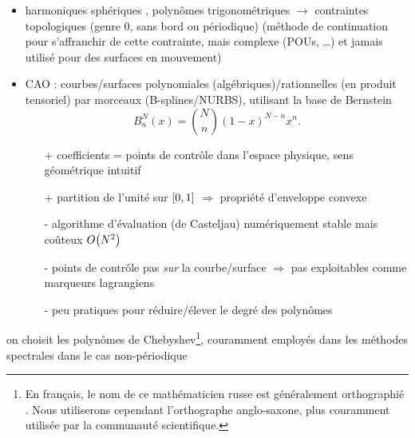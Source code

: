 \begin{itemize}
	\item harmoniques sphériques \cite{veerapaneni2011}, polynômes trigonométriques \cite{gueyffier2015} $\to$ contraintes topologiques (genre 0, sans bord ou périodique) (méthode de continuation \cite{bruno2007} pour s'affranchir de cette contrainte, mais complexe (POUs, \ldots) et jamais utilisé pour des surfaces en mouvement)
	\item CAO : courbes/surfaces polynomiales (algébriques)/rationnelles (en produit tensoriel) par morceaux (B-splines/NURBS), utilisant la base de Bernstein
	\begin{equation}
		B_n^N(x) = \binom{N}{n} \left( 1 - x \right)^{N-n} x^n.
	\end{equation}
	\begin{itemize}
		\item[+] coefficients = points de contrôle dans l'espace physique, sens géométrique intuitif
		\item[+] partition de l'unité sur $\left[ 0, 1 \right]$ $\Rightarrow$ propriété d'enveloppe convexe
		\item[-] algorithme d'évaluation (de Casteljau) numériquement stable mais coûteux $O\!\left( {N^2} \right)$
		\item[-] points de contrôle pas \emph{sur} la courbe/surface $\Rightarrow$ pas exploitables comme marqueurs lagrangiens
		\item[-] peu pratiques pour réduire/élever le degré des polynômes
	\end{itemize}
\end{itemize}
\bigskip
on choisit les polynômes de Chebyshev\footnote{En français, le nom de ce mathématicien russe est généralement orthographié . Nous utiliserons cependant l'orthographe anglo-saxone, plus couramment utilisée par la communauté scientifique.}, couramment employés dans les méthodes spectrales dans le cas non-périodique




